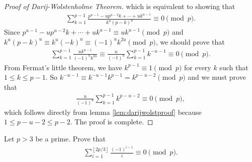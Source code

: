 \documentclass{subfile}
\begin{document}
\begin{proof}[Proof of Darij-Wolstenholme Theorem]
		which is equivalent to showing that
		\begin{align*}
		\sum_{k = 1}^{p - 1}\frac {p^{u - 1} - up^{u - 2}k+\cdots + uk^{u - 1}}{k^{u}\left(p - k\right)^{u}} \equiv 0 \pmod p.
		\end{align*}
		Since $p^{u - 1} - up^{u - 2}k+\cdots + uk^{u - 1} \equiv uk^{u - 1} \pmod p$ and $k^{u}\left(p - k\right)^{u} \equiv k^{u}\left( - k\right)^{u} \equiv (-1)^u k^{2u} \pmod p$, we should prove that
		\begin{align*}
		\sum_{k = 1}^{p - 1}\frac {uk^{u - 1}}{\left( - 1\right)^{u}k^{2u}}\equiv\frac {u}{\left( - 1\right)^{u}}\sum_{k = 1}^{p - 1}k^{ - u - 1} \equiv 0 \pmod p.
		\end{align*}
		From Fermat's little theorem, we have $k^{p-1} \equiv 1 \pmod p$ for every $k$ such that $1 \leq k \leq p-1$. So $ k^{ - u - 1}\equiv k^{ - u - 1}k^{p - 1} = k^{p - u - 2}\pmod p$ and we must prove that
		\begin{align*}
		\frac {u}{\left( - 1\right)^{u}}\sum_{k = 1}^{p - 1}k^{p - u - 2}\equiv 0 \pmod p,
		\end{align*}
		which follows directly from lemma \eqref{lem:darijwolstproof} because $ 1\leq p - u - 2\leq p - 2$. The proof is complete.
	\end{proof}
	
	\begin{problem}
		Let $p>3$ be a prime. Prove that
		\begin{align*}
		\sum_{i = 1}^{\left\lfloor 2p/3\right\rfloor}\frac {\left( - 1\right)^{i - 1}}{i} \equiv 0 \pmod p.
		\end{align*}
	\end{problem}
	
\end{document}
